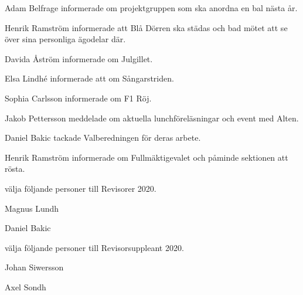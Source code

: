 \documentclass[10pt]{article}
\begin{document}
\begin{paragrafer}
\textbf{}

%

Adam Belfrage informerade om projektgruppen som ska anordna en bal nästa år. 

Henrik Ramström informerade att Blå Dörren ska städas och bad mötet att se över sina personliga ägodelar där.

Davida Åström informerade om Julgillet.

Elsa Lindhé informerade att om Sångarstriden.

Sophia Carlsson informerade om F1 Röj.

Jakob Pettersson meddelade om aktuella lunchföreläsningar och event med Alten.

Daniel Bakic tackade Valberedningen för deras arbete.


Henrik Ramström informerade om Fullmäktigevalet och påminde sektionen att rösta.

\begin{paralist}

    \Mba välja följande personer till Revisorer 2020.
    \begin{tightdashlist}
        \item Magnus Lundh
        \item Daniel Bakic
    \end{tightdashlist}

    \Mba välja följande personer till Revisorsuppleant 2020.
    \begin{tightdashlist}
        \item Johan Siwersson
        \item Axel Sondh
    \end{tightdashlist}
    


\end{paralist}
\end{paragrafer}
\end{document}
